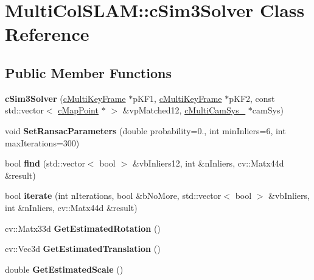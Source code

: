 \hypertarget{classMultiColSLAM_1_1cSim3Solver}{}\section{Multi\+Col\+S\+L\+AM\+:\+:c\+Sim3\+Solver Class Reference}
\label{classMultiColSLAM_1_1cSim3Solver}
\subsection*{Public Member Functions}
\begin{DoxyCompactItemize}
\item 
{\bfseries c\+Sim3\+Solver} (\hyperlink{classMultiColSLAM_1_1cMultiKeyFrame}{c\+Multi\+Key\+Frame} $\ast$p\+K\+F1, \hyperlink{classMultiColSLAM_1_1cMultiKeyFrame}{c\+Multi\+Key\+Frame} $\ast$p\+K\+F2, const std\+::vector$<$ \hyperlink{classMultiColSLAM_1_1cMapPoint}{c\+Map\+Point} $\ast$ $>$ \&vp\+Matched12, \hyperlink{classMultiColSLAM_1_1cMultiCamSys__}{c\+Multi\+Cam\+Sys\+\_\+} $\ast$cam\+Sys)\hypertarget{classMultiColSLAM_1_1cSim3Solver_a9e6faed89d1b53c020821c9a52b6010a}{}\label{classMultiColSLAM_1_1cSim3Solver_a9e6faed89d1b53c020821c9a52b6010a}

\item 
void {\bfseries Set\+Ransac\+Parameters} (double probability=0., int min\+Inliers=6, int max\+Iterations=300)\hypertarget{classMultiColSLAM_1_1cSim3Solver_a70f372cb7b83033006f2fe338fde14a1}{}\label{classMultiColSLAM_1_1cSim3Solver_a70f372cb7b83033006f2fe338fde14a1}

\item 
bool {\bfseries find} (std\+::vector$<$ bool $>$ \&vb\+Inliers12, int \&n\+Inliers, cv\+::\+Matx44d \&result)\hypertarget{classMultiColSLAM_1_1cSim3Solver_a6196d1e11afdcaa287d3ab2ee6ab1bc6}{}\label{classMultiColSLAM_1_1cSim3Solver_a6196d1e11afdcaa287d3ab2ee6ab1bc6}

\item 
bool {\bfseries iterate} (int n\+Iterations, bool \&b\+No\+More, std\+::vector$<$ bool $>$ \&vb\+Inliers, int \&n\+Inliers, cv\+::\+Matx44d \&result)\hypertarget{classMultiColSLAM_1_1cSim3Solver_a8867796afb511f6fe5333e78cb793697}{}\label{classMultiColSLAM_1_1cSim3Solver_a8867796afb511f6fe5333e78cb793697}

\item 
cv\+::\+Matx33d {\bfseries Get\+Estimated\+Rotation} ()\hypertarget{classMultiColSLAM_1_1cSim3Solver_a17175d1d8cbe7cc657d1684dc5502a90}{}\label{classMultiColSLAM_1_1cSim3Solver_a17175d1d8cbe7cc657d1684dc5502a90}

\item 
cv\+::\+Vec3d {\bfseries Get\+Estimated\+Translation} ()\hypertarget{classMultiColSLAM_1_1cSim3Solver_afa067f4aa52ebd82ef79aa530b9bba4a}{}\label{classMultiColSLAM_1_1cSim3Solver_afa067f4aa52ebd82ef79aa530b9bba4a}

\item 
double {\bfseries Get\+Estimated\+Scale} ()\hypertarget{classMultiColSLAM_1_1cSim3Solver_ac0012ab08bc83267f8fdc7ed3925be9c}{}\label{classMultiColSLAM_1_1cSim3Solver_ac0012ab08bc83267f8fdc7ed3925be9c}

\end{DoxyCompactItemize}
